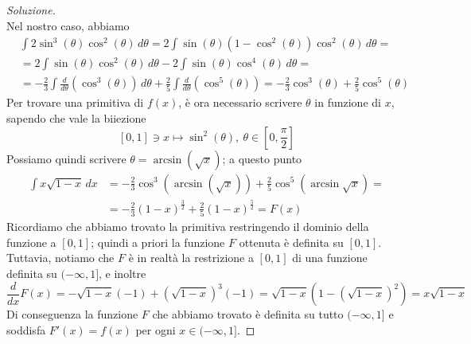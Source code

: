 \begin{proof}[Soluzione]
\[    \]
    Nel nostro caso, abbiamo 
    \[
    \begin{split}
        & \int 2\sin^3(\theta)\cos^2(\theta)\, d\theta = 2\int \sin(\theta)(1-\cos^2(\theta))\cos^2(\theta)\, d\theta = \\
        & = 2\int \sin(\theta)\cos^2(\theta)\, d\theta - 2\int \sin(\theta)\cos^4(\theta)\, d\theta = \\
        & = -\frac{2}{3}\int \frac{d}{d\theta}(\cos^3(\theta))\, d\theta +\frac{2}{5} \int \frac{d}{d\theta}(\cos^5(\theta)) = -\frac{2}{3}\cos^3(\theta) + \frac{2}{5}\cos^5(\theta)
    \end{split}
    \]
    Per trovare una primitiva di $f(x)$, è ora necessario scrivere $\theta$ in funzione di $x$, sapendo che vale la biiezione
    \[
    [0,1]\ni x \mapsto \sin^2(\theta), \ \theta\in\left[0,\frac{\pi}{2}\right] 
    \]
    Possiamo quindi scrivere $\theta=\arcsin(\sqrt{x})$; a questo punto
    \[
    \begin{split}
        \int x\sqrt{1-x}\, dx & = -\frac{2}{3}\cos^3(\arcsin(\sqrt{x}))+\frac{2}{5}\cos^5(\arcsin{\sqrt{x}}) = \\
        & = -\frac{2}{3}(1-x)^{\frac{3}{2}}+\frac{2}{5}(1-x)^{\frac{5}{2}} = F(x)
    \end{split}
    \]
    Ricordiamo che abbiamo trovato la primitiva restringendo il dominio della funzione a $[0,1]$; quindi a priori la funzione $F$ ottenuta è definita su $[0,1]$. Tuttavia, notiamo che $F$ è in realtà la restrizione a $[0,1]$ di una funzione definita su $(-\infty, 1]$, e inoltre
    \[
    \frac{d}{dx}F(x) = -\sqrt{1-x}(-1)+(\sqrt{1-x})^3(-1) = \sqrt{1-x}\left(1-(\sqrt{1-x})^2\right) = x\sqrt{1-x}
    \]
    Di conseguenza la funzione $F$ che abbiamo trovato è definita su tutto $(-\infty, 1]$ e soddisfa $F'(x) = f(x)$ per ogni $x\in(-\infty, 1]$.
\end{proof}
